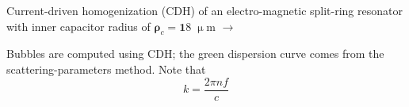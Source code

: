 \documentclass[t]{beamer} \usepackage[english]{babel} \usepackage[utf8]{inputenc} \usetheme{Frankfurt} %
\begin{document}
\begin{frame}[plain]{}%
\begin{columns}[T] %
	\begin{column}{.55\textwidth}
	\vspace{3mm}
	\noindent Current-driven homogenization (CDH) of an electro-magnetic split-ring resonator with inner capacitor radius of $\pmb\rho_c=\pmb 18\;\upmu$m $\rightarrow$
	\vspace{3mm}

	\noindent Bubbles are computed using CDH; the green dispersion curve comes from the scattering-parameters method. Note that $$k = \frac{2\pi n f}{c}$$
	\vspace{5mm}


\end{column}
\end{columns}
\end{frame}
\end{document}

